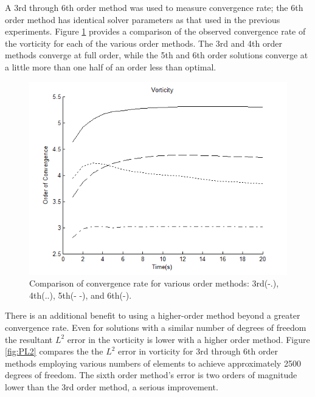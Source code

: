 \documentclass[letterpaper,12pt]{report}
\begin{document}
A 3rd through 6th order method was used to measure convergence rate; the 6th order method has identical solver parameters as that used in the previous experiments. Figure \ref{fig:Porder} provides a comparison of the observed convergence rate of the vorticity for each of the various order methods. The 3rd and 4th order methods converge at full order, while the 5th and 6th order solutions converge at a little more than one half of an order less than optimal.

\begin{figure}
\centering
\includegraphics[width=1\textwidth]{Porder.PNG}
\caption{\label{fig:Porder}Comparison of convergence rate for various order methods: 3rd(-.), 4th(..), 5th(- -), and 6th(-).}
\end{figure}

There is an additional benefit to using a higher-order method beyond a greater convergence rate. Even for solutions with a similar number of degrees of freedom the resultant $L^2$ error in the vorticity is lower with a higher order method. Figure \ref{fig:PL2} compares the the $L^2$ error in vorticity for 3rd through 6th order methods employing various numbers of elements to achieve approximately 2500 degrees of freedom. The sixth order method's error is two orders of magnitude lower than the 3rd order method, a serious improvement.
\end{document}

